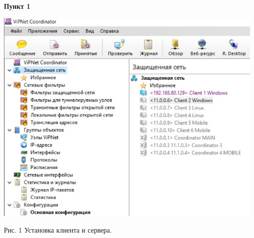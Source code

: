 \documentclass[a4paper,14pt]{extarticle}
\begin{document}
    \textbf{Пункт 1}
    \vspace{-3ex}
    \begin{center}
        \singlespacing

        \includegraphics[scale=0.3]{pics/1.jpg}

        Рис. 1 Установка клиента и сервера.
    \end{center}
\end{document}

